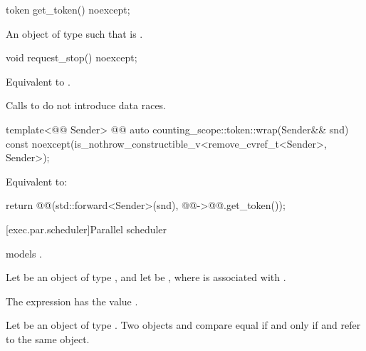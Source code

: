 %
\begin{itemdecl}
token get_token() noexcept;
\end{itemdecl}

\begin{itemdescr}
\pnum
\returns
An object  of type  such that
 is .
\end{itemdescr}

%
\begin{itemdecl}
void request_stop() noexcept;
\end{itemdecl}

\begin{itemdescr}
\pnum
\effects
Equivalent to .

\pnum
\remarks
Calls to  do not introduce data races.
\end{itemdescr}

%
\begin{itemdecl}
template<@@ Sender>
  @@ auto counting_scope::token::wrap(Sender&& snd) const
    noexcept(is_nothrow_constructible_v<remove_cvref_t<Sender>, Sender>);
\end{itemdecl}

\begin{itemdescr}
\pnum
\effects
Equivalent to:
\begin{codeblock}
return @@(std::forward<Sender>(snd), @@->@@.get_token());
\end{codeblock}
\end{itemdescr}

[exec.par.scheduler]{Parallel scheduler}

\pnum
{} models .

\pnum
Let  be an object of type , and
let  be ,
where  is associated with .

\pnum
The expression  has the value
.

\pnum
Let  be an object of type .
Two objects  and  compare equal if and only if
 and
 refer to the same object.

